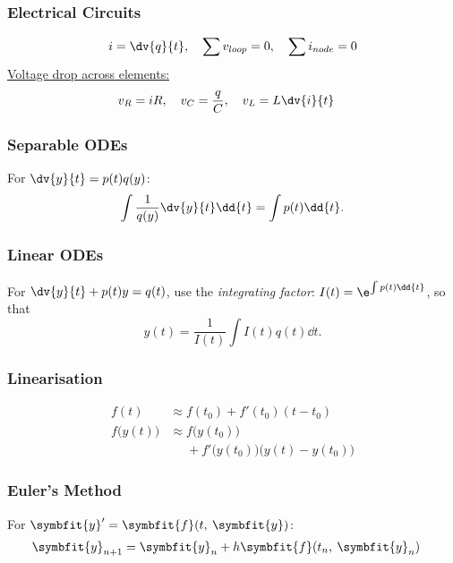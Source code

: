\documentclass{article}
\begin{document}
\begin{multicols}{3}
    \subsubsection*{Electrical Circuits}
    \begin{align*}
        i = \dv{q}{t},\quad \sum v_{loop} = 0,\quad \sum i_{node} = 0
    \end{align*}
    \underline{Voltage drop across elements:}
    \begin{align*}
        v_R = iR,\quad v_C = \frac{q}{C},\quad v_L & = L \dv{i}{t}
    \end{align*}
    \subsubsection*{Separable ODEs}
    For $\dv{y}{t} = p(t) q(y)$:
    \begin{equation*}
        \int \frac{1}{q(y)} \dv{y}{t} \dd{t} = \int p(t) \dd{t}.
    \end{equation*}
    \subsubsection*{Linear ODEs}
    For $\dv{y}{t} + p(t)y = q(t)$, use the \textit{integrating factor}:
    $I(t) = \e^{\int p(t) \dd{t}}$, so that
    \begin{equation*}
        y(t) = \frac{1}{I(t)} \int I(t) q(t) \dd{t}.
    \end{equation*}
    \subsubsection*{Linearisation}
    \begin{align*}
        f(t)              & \approx f(t_0) + f'(t_0)(t-t_0)                                 \\
        f\bigl(y(t)\bigr) & \approx f\bigl(y(t_0)\bigr)                                     \\
                          & \phantom{\approx} + f'\bigl(y(t_0)\bigr)\bigl(y(t)-y(t_0)\bigr)
    \end{align*}
    \subsubsection*{Euler's Method}
    For $\symbfit{y}' = \symbfit{f}(t,\: \symbfit{y})$:
    \begin{align*}
        \symbfit{y}_{n+1} & = \symbfit{y}_{n} + h\symbfit{f}(t_n,\: \symbfit{y}_n)
    \end{align*}

\end{multicols}
\end{document}
